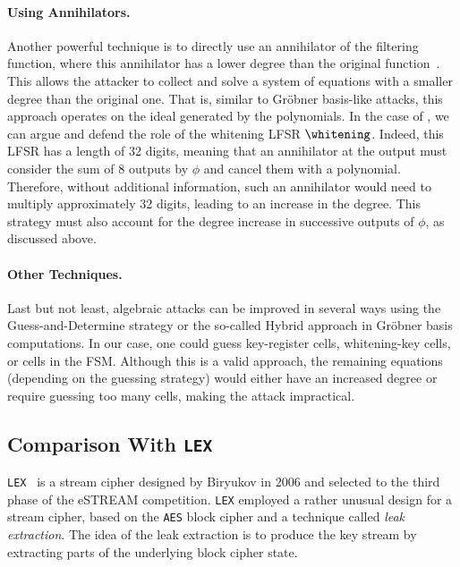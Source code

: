 \paragraph{Using Annihilators.} Another powerful technique is to directly use an annihilator of the filtering function, where this annihilator has a lower degree than the original function~\cite{EC:CouMei03,C:Courtois03}. This allows the attacker to collect and solve a system of equations with a smaller degree than the original one. That is, similar to Gröbner basis-like attacks, this approach operates on the ideal generated by the polynomials. In the case of \coolName{}, we can argue and defend the role of the whitening LFSR \( \whitening \). Indeed, this LFSR has a length of 32 digits, meaning that an annihilator at the output must consider the sum of 8 outputs by \( \phi \) and cancel them with a polynomial. Therefore, without additional information, such an annihilator would need to multiply approximately 32 digits, leading to an increase in the degree. This strategy must also account for the degree increase in successive outputs of \( \phi \), as discussed above.

\paragraph{Other Techniques.}
Last but not least, algebraic attacks can be improved in several ways using the Guess-and-Determine strategy or the so-called Hybrid approach in Gröbner basis computations. In our case, one could guess key-register cells, whitening-key cells, or cells in the FSM. Although this is a valid approach, the remaining equations (depending on the guessing strategy) would either have an increased degree or require guessing too many cells, making the attack impractical.



\subsection{Comparison With {\tt LEX}}
\label{sec:security-lex}

{\tt LEX}~\cite{SAC:Biryukov06} is a stream cipher designed by Biryukov in 2006 and selected to the third phase of the eSTREAM competition. {\tt LEX} employed a rather unusual design for a stream cipher, based on the {\tt \gls{AES}} block cipher and a technique called \emph{leak extraction}. The idea of the leak extraction is to produce the key stream by extracting parts of the underlying block cipher state.

